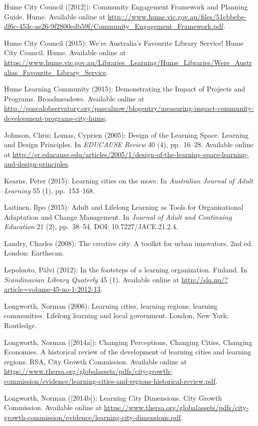 \documentclass[a4paper,
fontsize=11pt,
oneside,
numbers=noperiodatend,
parskip=half-,
bibliography=totoc,
final
]{scrartcl}
\begin{document}
Hume City Council ({[}2012{]}): Community Engagement Framework and
Planning Guide. Hume. Available online at
\url{http:://www.hume.vic.gov.au/files/51cbbebe-df6c-453c-ae26-9f2800edb59f/Community_Engagement_Framework.pdf}.

Hume City Council (2015): We're Australia's Favourite Library Service!
Hume City Council. Hume. Available online at
\url{https://www.hume.vic.gov.au/Libraries_Learning/Hume_Libraries/Were_Australias_Favourite_Library_Service}.

Hume Learning Community (2015): Demonstrating the Impact of Projects and
Programs. Broadmeadows. Available online at
\url{http://pascalobservatory.org/pascalnow/blogentry/measuring-impact-community-development-programs-city-hume}.

Johnson, Chris; Lomas, Cyprien (2005): Design of the Learning Space.
Learning and Design Principles. In \emph{EDUCAUSE Review} 40 (4),
pp.~16--28. Available online at
\url{http://er.educause.edu/articles/2005/1/design-of-the-learning-space-learning-and-design-principles}.

Kearns, Peter (2015): Learning cities on the move. In \emph{Australian
Journal of Adult Learning} 55 (1), pp.~153--168.

Laitinen, Ilpo (2015): Adult and Lifelong Learning as Tools for
Organisational Adaptation and Change Management. In \emph{Journal of
Adult and Continuing Education} 21 (2), pp.~38--54. DOI:
10.7227/JACE.21.2.4.

Landry, Charles (2008): The creative city. A toolkit for urban
innovators. 2nd ed. London: Earthscan.

Lepoluoto, Pälvi (2012): In the footsteps of a learning organization.
Finland. In \emph{Scandinavian Library Quaterly} 45 (1). Available
online at \url{http://slq.nu/?article=volume-45-no-1-2012-13}.

Longworth, Norman (2006): Learning cities, learning regions, learning
communities. Lifelong learning and local government. London, New York:
Routledge.

Longworth, Norman ({[}2014a{]}): Changing Perceptions, Changing Cities,
Changing Economies. A historical review of the development of learning
cities and learning regions. RSA, City Growth Commission. Available
online at
\url{https://www.thersa.org/globalassets/pdfs/city-growth-commission/evidence/learning-cities-and-regions-historical-review.pdf}.

Longworth, Norman ({[}2014b{]}): Learning City Dimensions. City Growth
Commission. Available online at
\url{https://www.thersa.org/globalassets/pdfs/city-growth-commission/evidence/learning-city-dimensions.pdf}.
\end{document}
